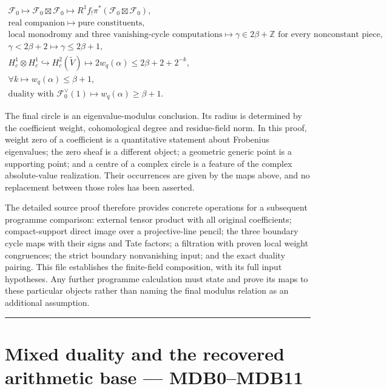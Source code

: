 \documentclass[
]{report}
\begin{document}
\[
\begin{gathered}
\mathcal F_0
\longmapsto\mathcal F_0\boxtimes\mathcal F_0
\longmapsto R^1f_!\pi^*(\mathcal F_0\boxtimes\mathcal F_0),\\
\text{real companion}\longmapsto\text{pure constituents},\\
\text{local monodromy and three vanishing-cycle computations}
\longmapsto\gamma\in2\beta+\mathbb Z\text{ for every nonconstant piece},\\
\gamma<2\beta+2\longmapsto\gamma\le2\beta+1,\\
H_c^1\otimes H_c^1\hookrightarrow H_c^2(\widetilde V)
\longmapsto
2w_q(\alpha)\le2\beta+2+2^{-k},\\
\forall k\longmapsto w_q(\alpha)\le\beta+1,\\
\text{duality with }\mathcal F_0^\vee(1)
\longmapsto w_q(\alpha)\ge\beta+1.
\end{gathered}
\tag{DW11.1}
\]

The final circle is an eigenvalue-modulus conclusion. Its radius is
determined by the coefficient weight, cohomological degree and
residue-field norm. In this proof, weight zero of a coefficient is a
quantitative statement about Frobenius eigenvalues; the zero sheaf is a
different object; a geometric generic point is a supporting point; and a
centre of a complex circle is a feature of the complex absolute-value
realization. Their occurrences are given by the maps above, and no
replacement between those roles has been asserted.

The detailed source proof therefore provides concrete operations for a
subsequent programme comparison: external tensor product with all
original coefficients; compact-support direct image over a
projective-line pencil; the three boundary cycle maps with their signs
and Tate factors; a filtration with proven local weight congruences; the
strict boundary nonvanishing input; and the exact duality pairing. This
file establishes the finite-field composition, with its full input
hypotheses. Any further programme calculation must state and prove its
maps to these particular objects rather than naming the final modulus
relation as an additional assumption.

\begin{center}\rule{0.5\linewidth}{0.5pt}\end{center}

\chapter{Mixed duality and the recovered arithmetic base ---
MDB0--MDB11}\label{mixed-duality-and-the-recovered-arithmetic-base-mdb0mdb11}
\end{document}
